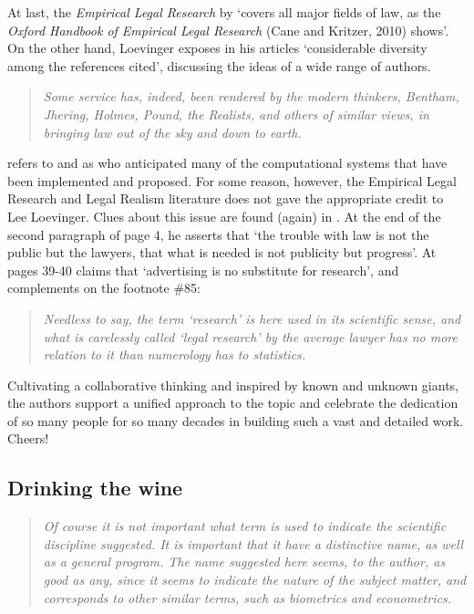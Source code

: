 \documentclass[a4paper]{exam}
\theoremstyle{plain}
\begin{document}
At last, the \textit{Empirical Legal Research} by \cite[$P=328, L=0, J=0$]{leeuw2016empirical} `covers all major fields of law, as the \textit{Oxford Handbook of Empirical Legal Research} (Cane and Kritzer, 2010) shows'. On the other hand, Loevinger exposes in his articles `considerable diversity among the references cited', discussing the ideas of a wide range of authors.
\begin{quote}
\textit{Some service has, indeed, been rendered by the modern thinkers, Bentham, Jhering, Holmes, Pound, the Realists, and others of similar views, in bringing law out of the sky and down to earth.} \cite[p. 15]{loevinger1949jurimetrics}
\end{quote}

\cite{bench2015knowledge} refers to \cite{loevinger1949jurimetrics} and \cite{mehl1958automation} as who anticipated many of the computational systems that have been implemented and proposed. For some reason, however, the Empirical Legal Research and Legal Realism literature does not gave the appropriate credit to Lee Loevinger. Clues about this issue are found (again) in \cite{loevinger1949jurimetrics}. At the end of the second paragraph of page 4, he asserts that `the trouble with law is not the public but the lawyers, that what is needed is not publicity but progress'. At pages 39-40 claims that `advertising is no substitute for research', and complements on the footnote \#85:
\begin{quote}
\textit{Needless to say, the term `research' is here used in its scientific sense, and what is carelessly called `legal research' by the average lawyer has no more relation to it than numerology has to statistics.} \cite[p. 40]{loevinger1949jurimetrics}
\end{quote}

Cultivating a collaborative thinking and inspired by known and unknown giants, the authors support a unified approach to the topic and celebrate the dedication of so many people for so many decades in building such a vast and detailed work. Cheers!


\subsection{Drinking the wine}\label{sec:drinking}

\begin{quote}
\textit{Of course it is not important what term is used to indicate the scientific discipline suggested. It is important that it have a distinctive name, as well as a general program. The name suggested here seems, to the author, as good as any, since it seems to indicate the nature of the subject matter, and corresponds to other similar terms, such as biometrics and econometrics.} \cite[p. 31]{loevinger1949jurimetrics}
\end{quote}
\end{document}
